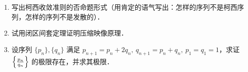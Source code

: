 \begin{exercise}{}
\begin{enumerate}
\item 写出柯西收敛准则的否命题形式（用肯定的语气写出：怎样的序列不是柯西序列，怎样的序列不是发散的）．
\item 试用闭区间套定理证明压缩映像原理．
\item 设序列 $\{p_n\}, \{q_n\}$ 满足 $p_{n+1}=p_n+2q_n,\ q_{n+1}=p_n+q_n,\ p_1=q_1=1$，求证 $\left\{\large\frac{p_n}{q_n}\right\}$ 的极限存在，并求其极限．
\end{enumerate}
\end{exercise}